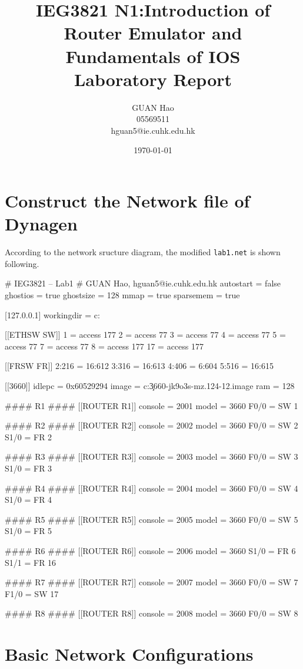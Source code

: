 \documentclass[10pt]{article}
\author{GUAN Hao\\05569511\\hguan5@ie.cuhk.edu.hk}
\title{IEG3821 N1:Introduction of Router Emulator and Fundamentals of IOS\\Laboratory Report}
\date{\today}
\begin{document}
\maketitle
\section{Construct the Network file of Dynagen}
According to the network sructure diagram, the modified {\tt lab1.net} is shown following.
\begin{verbatim*}
# IEG3821 – Lab1
# GUAN Hao, hguan5@ie.cuhk.edu.hk
autostart = false
ghostios = true
ghostsize = 128
mmap = true
sparsemem = true

[127.0.0.1]
workingdir = c:\temp\mydir{} 


[[ETHSW SW]]
1 = access 177
2 = access 77
3 = access 77
4 = access 77
5 = access 77
7 = access 77
8 = access 177
17 = access 177

[[FRSW FR]]
2:216 = 16:612
3:316 = 16:613
4:406 = 6:604
5:516 = 16:615

[[3660]]
idlepc = 0x60529294
image = c:\temp\MyDir{}\images\c3660-jk9o3s-mz.124-12.image
ram = 128

#### R1 ####
[[ROUTER R1]]
console = 2001
model = 3660
F0/0 = SW 1

#### R2 ####
[[ROUTER R2]]
console = 2002
model = 3660
F0/0 = SW 2
S1/0 = FR 2

#### R3 ####
[[ROUTER R3]]
console = 2003
model = 3660
F0/0 = SW 3
S1/0 = FR 3

#### R4 ####
[[ROUTER R4]]
console = 2004
model = 3660
F0/0 = SW 4
S1/0 = FR 4


#### R5 ####
[[ROUTER R5]]
console = 2005
model = 3660
F0/0 = SW 5
S1/0 = FR 5


#### R6 ####
[[ROUTER R6]]
console = 2006
model = 3660
S1/0 = FR 6
S1/1 = FR 16


#### R7 ####
[[ROUTER R7]]
console = 2007
model = 3660
F0/0 = SW 7
F1/0 = SW 17


#### R8 ####
[[ROUTER R8]]
console = 2008
model = 3660
F0/0 = SW 8

\end{verbatim*}
\section{Basic Network Configurations}
\end{document}
